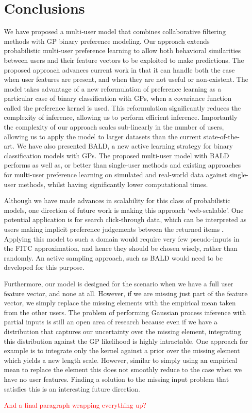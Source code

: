 \section{Conclusions \label{sec:conclusions}}

We have proposed a multi-user model that combines collaborative filtering methods
with GP binary preference modeling.
Our approach extends probabilistic multi-user preference learning to allow both behavioral similarities 
between users and their feature vectors to be exploited to make predictions.
The proposed approach advances current work in that it can handle both the case when
user features are present, and when they are not useful or non-existent.
The model takes advantage of a new reformulation of preference learning as a particular case of binary classification with GPs,
when a covariance function called the preference kernel is used.
This reformulation significantly reduces the complexity of inference,
allowing us to perform efficient inference. Importantly the complexity
of our approach scales sub-linearly in the number of users, allowing 
us to apply the model to larger datasets than the current state-of-the-art.
We have also presented BALD,
a new active learning strategy for binary classification models with GPs. The proposed multi-user model with BALD performs as well as, or better than single-user methods
and existing approaches for multi-user preference learning on simulated and real-world data against single-user methods, whilst having significantly lower computational times.

Although we have made advances in scalability for this class of probabilistic models, 
one direction of future work is making this approach `web-scalable'.
One potential application is for search click-through data,
which can be interpreted as users making implicit preference judgements between the returned items \citep{joachims2005}.
Applying this model to such a domain would require very few pseudo-inputs in the FITC approximation,
and hence they should be chosen wisely, rather than randomly.
An active sampling approach, such as BALD would need to be developed for this purpose.

Furthermore, our model is designed for the scenario when we have a full user feature vector, and none at all.
However, if we are missing just part of the feature vector, we simply replace the
missing elements with the empirical mean
taken from the other users. 
The problem of performing Gaussian process inference with partial inputs
is still an open area of research because
even if we have a distribution that captures our uncertainty over the missing element,
integrating this distribution against the GP likelihood is highly intractable.
One approach for example is to integrate only the kernel against a prior over the missing element \citep{girard2003} which yields a new length scale.
However, similar to simply using an empirical mean to replace the element this does not smoothly reduce to
the case when we have no user features. Finding a solution to the missing input problem that satisfies this is 
an interesting future direction.

\textcolor{red}{And a final paragraph wrapping everything up?}
